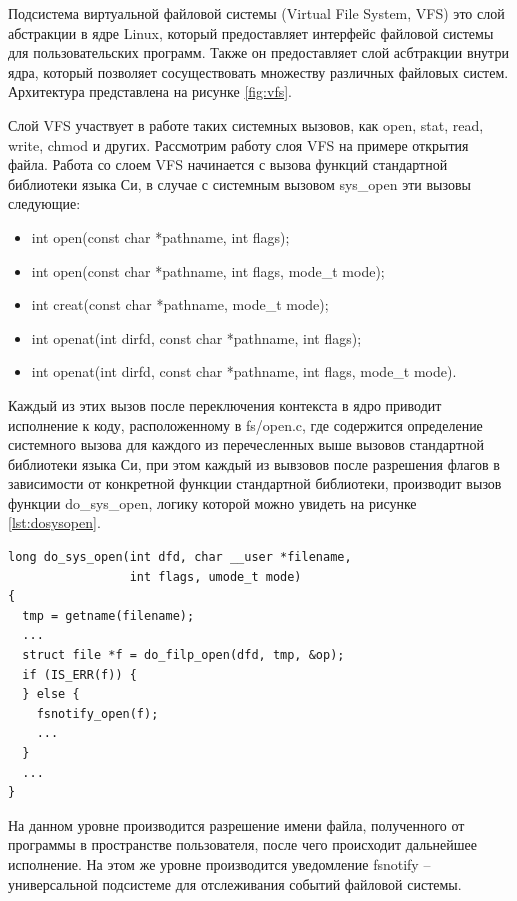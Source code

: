 \documentclass{gost7.32-2001}
\begin{document}
Подсистема виртуальной файловой системы (Virtual File System, VFS) это
слой абстракции в ядре Linux, который предоставляет интерфейс файловой
системы для пользовательских программ. Также он предоставляет слой
асбтракции внутри ядра, который позволяет сосуществовать множеству
различных файловых систем. Архитектура представлена на рисунке
\ref{fig:vfs}.


Слой VFS участвует в работе таких системных вызовов, как open, stat,
read, write, chmod и других. Рассмотрим работу слоя VFS на примере
открытия файла.  Работа со слоем VFS начинается с вызова функций
стандартной библиотеки языка Си, в случае с системным вызовом
sys\_open эти вызовы следующие:
\begin{itemize}
\item
  int open(const char *pathname, int flags);
\item
  int open(const char *pathname, int flags, mode\_t mode);
\item
  int creat(const char *pathname, mode\_t mode);
\item
  int openat(int dirfd, const char *pathname, int flags);
\item
  int openat(int dirfd, const char *pathname, int flags, mode\_t mode).
\end{itemize}

Каждый из этих вызов после переключения контекста в ядро приводит
исполнение к коду, расположенному в fs/open.c, где содержится
определение системного вызова для каждого из перечесленных выше
вызовов стандартной библиотеки языка Си, при этом каждый из вывзовов
после разрешения флагов в зависимости от конкретной функции
стандартной библиотеки, производит вызов функции do\_sys\_open, логику
которой можно увидеть на рисунке \ref{lst:dosysopen}.

\begin{lstlisting}[caption={Ключевые особенности функции do\_sys\_open},
    captionpos=b, float, label={lst:dosysopen}]
long do_sys_open(int dfd, char __user *filename,
                 int flags, umode_t mode)
{
  tmp = getname(filename);
  ...
  struct file *f = do_filp_open(dfd, tmp, &op);
  if (IS_ERR(f)) {
  } else {
    fsnotify_open(f);
    ...
  }
  ...
}
\end{lstlisting}
На данном уровне производится разрешение имени файла, полученного от
программы в пространстве пользователя, после чего происходит
дальнейшее исполнение. На этом же уровне производится уведомление
fsnotify – универсальной подсистеме для отслеживания событий файловой
системы.
\end{document}
